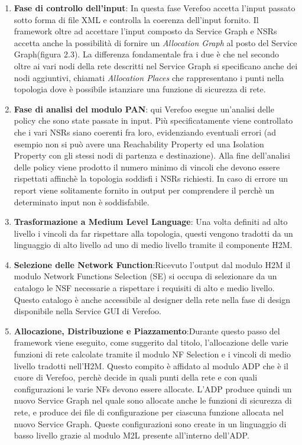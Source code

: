 \begin{enumerate}
    \item \textbf{Fase di controllo dell'input}: In questa fase Verefoo accetta l'input passato sotto forma di file XML e controlla la coerenza dell'input fornito. Il framework 
         oltre ad accettare l'input composto da Service Graph e NSRs accetta anche la possibilità di fornire un \textit{Allocation Graph} al posto del Service Graph(figura 2.3). La
         differenza fondamentale fra i due è che nel secondo oltre ai vari nodi della rete descritti nel Service Graph si specificano anche dei nodi aggiuntivi, chiamati \textit{Allocation Places}
         che rappresentano i punti nella topologia dove è possibile istanziare una funzione di sicurezza di rete.
    \item \textbf{Fase di analisi del modulo PAN}: qui Verefoo esegue un'analisi delle policy che sono state passate in input. Più specificatamente viene controllato che i vari NSRs siano coerenti fra
    loro, evidenziando eventuali errori (ad esempio non si può avere una Reachability Property ed una Isolation Property con gli stessi nodi di partenza e destinazione). Alla fine dell'analisi delle policy
    viene prodotto il numero minimo di vincoli che devono essere rispettati affinchè la topologia soddisfi i NSRs richiesti. In caso di errore un report viene solitamente fornito in output per comprendere 
    il perchè un determinato input non è soddisfabile.
    \item \textbf{Trasformazione a Medium Level Language}: Una volta definiti ad alto livello i vincoli da far rispettare alla topologia, questi vengono tradotti da un linguaggio di alto livello
    ad uno di medio livello tramite il componente H2M. 
    \item  \textbf{Selezione delle Network Function}:Ricevuto l'output dal modulo H2M il modulo Network Functions Selection (SE) si occupa di selezionare da un catalogo le NSF necessarie a rispettare i requisiti
    di alto e medio livello. Questo catalogo è anche accessibile al designer della rete nella fase di design disponibile nella Service GUI di Verefoo.
    \item \textbf{Allocazione, Distribuzione e Piazzamento}:Durante questo passo del framework viene eseguito, come suggerito dal titolo, l'allocazione delle varie funzioni di rete calcolate tramite
    il modulo NF Selection e i vincoli di medio livello tradotti nell'H2M. Questo compito è affidato al modulo ADP che è il cuore di Verefoo, perchè decide in quali punti della rete e con quali configurazioni
    le varie NFs devono essere allocate. L'ADP produce quindi un nuovo Service Graph nel quale sono allocate anche le funzioni di sicurezza di rete, e produce dei file di configurazione per ciascuna funzione allocata
    nel nuovo Service Graph. Queste configurazioni sono create in un linguaggio di basso livello grazie al modulo M2L presente all'interno dell'ADP.
\end{enumerate}


